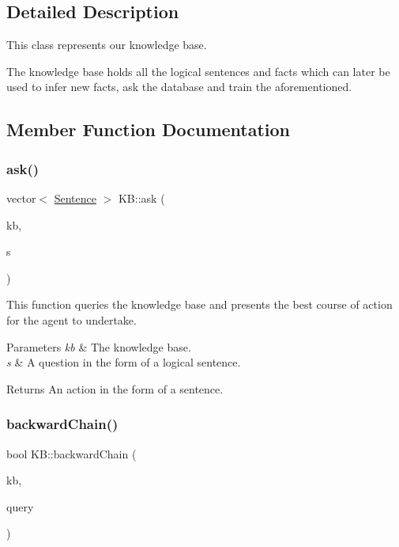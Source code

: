 \subsection{Detailed Description}
This class represents our knowledge base. 

The knowledge base holds all the logical sentences and facts which can later be used to infer new facts, ask the database and train the aforementioned. 

\subsection{Member Function Documentation}
\mbox{\label{classKB_a12ab1eba4e3792f802c943163a308518}} 
\subsubsection{\texorpdfstring{ask()}{ask()}}
{\footnotesize\ttfamily vector$<$ \mbox{\hyperlink{classSentence}{Sentence}} $>$ K\+B\+::ask (\begin{DoxyParamCaption}\item[{\mbox{\hyperlink{classKB}{KB}}}]{kb,  }\item[{vector$<$ \mbox{\hyperlink{classSentence}{Sentence}} $>$}]{s }\end{DoxyParamCaption})}



This function queries the knowledge base and presents the best course of action for the agent to undertake. 


\begin{DoxyParams}{Parameters}
{\em kb} & The knowledge base. \\
\hline
{\em s} & A question in the form of a logical sentence. \\
\hline
\end{DoxyParams}
\begin{DoxyReturn}{Returns}
An action in the form of a sentence. 
\end{DoxyReturn}
\mbox{\label{classKB_a27a8db9fc36354f1f6eb247dfcb58adc}} 
\subsubsection{\texorpdfstring{backward\+Chain()}{backwardChain()}}
{\footnotesize\ttfamily bool K\+B\+::backward\+Chain (\begin{DoxyParamCaption}\item[{\mbox{\hyperlink{classKB}{KB}}}]{kb,  }\item[{vector$<$ \mbox{\hyperlink{classSentence}{Sentence}} $>$}]{query }\end{DoxyParamCaption})}



